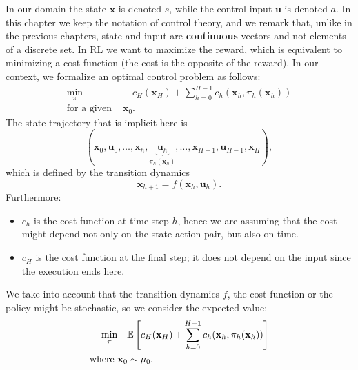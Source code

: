 \documentclass[10pt, a4paper]{report}
\begin{document}
In our domain the state $\mathbf x$ is denoted $s$, while the control input $\mathbf u$ is denoted $a$. In this chapter we keep the notation of control theory, and we remark that, unlike in the previous chapters, state and input are \textbf{continuous} vectors and not elements of a discrete set. In RL we want to maximize the reward, which is equivalent to minimizing a cost function (the cost is the opposite of the reward). In our context, we formalize an optimal control problem as follows:\begin{align}
    \min_\pi&\quad c_H(\mathbf x_H)+\sum_{h=0}^{H-1}c_h(\mathbf x_h,\pi_h(\mathbf x_h))\\ 
    \text{for a given }&\mathbf x_0.
\end{align}
The state trajectory that is implicit here is\begin{equation}
    (\mathbf x_0,\mathbf u_0,\dots,\mathbf x_h,\underbrace{\mathbf u_h}_{\pi_h(\mathbf x_h)},\dots,\mathbf x_{H-1},\mathbf u_{H-1},\mathbf x_H),
\end{equation}
which is defined by the transition dynamics\begin{equation}
    \mathbf x_{h+1}=f(\mathbf x_h,\mathbf u_h).
\end{equation}
Furthermore: \begin{itemize}
    \item $c_h$ is the cost function at time step $h$, hence we are assuming that the cost might depend not only on the state-action pair, but also on time.
    \item $c_H$ is the cost function at the final step; it does not depend on the input since the execution ends here.
\end{itemize}
\noindent We take into account that the transition dynamics $f$, the cost function or the policy might be stochastic, so we consider the expected value:
\begin{align}
    \min_\pi&\quad{\mathbb E} \left[ c_H(\mathbf x_H)+\sum_{h=0}^{H-1}c_h(\mathbf x_h,\pi_h(\mathbf x_h)) \right] \\ 
    \text{where }&\mathbf x_0\sim\mu_0.
\end{align}
\end{document}
